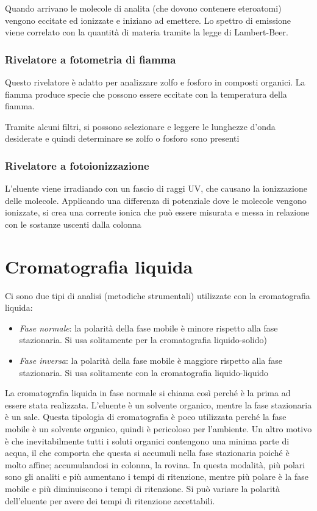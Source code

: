 
Quando arrivano le molecole di analita (che dovono contenere eteroatomi) vengono eccitate ed ionizzate e iniziano ad emettere. Lo spettro di emissione viene correlato con la quantità di materia tramite la legge di Lambert-Beer.

\subsubsection{Rivelatore a fotometria di fiamma}
Questo rivelatore è adatto per analizzare zolfo e fosforo in composti organici. La fiamma produce specie che possono essere eccitate con la temperatura della fiamma. 


Tramite alcuni filtri, si possono selezionare e leggere le lunghezze d'onda desiderate e quindi determinare se zolfo o fosforo sono presenti

\subsubsection{Rivelatore a fotoionizzazione}
L'eluente viene irradiando con un fascio di raggi UV, che causano la ionizzazione delle molecole. Applicando una differenza di potenziale dove le molecole vengono ionizzate, si crea una corrente ionica che può essere misurata e messa in relazione con le sostanze uscenti dalla colonna


\section{Cromatografia liquida}
Ci sono due tipi di analisi (metodiche strumentali) utilizzate con la cromatografia liquida:
\begin{itemize}
\item \textit{Fase normale}: la polarità della fase mobile è minore rispetto alla fase stazionaria. Si usa solitamente per la cromatografia liquido-solido)
\item \textit{Fase inversa}: la polarità della fase mobile è maggiore rispetto alla fase stazionaria. Si usa solitamente con la cromatografia liquido-liquido 
\end{itemize}

La cromatografia liquida in fase normale si chiama così perché è la prima ad essere stata realizzata. L'eluente è un solvente organico, mentre la fase stazionaria è un sale. Questa tipologia di cromatografia è poco utilizzata perché la fase mobile è un solvente organico, quindi è pericoloso per l'ambiente. Un altro motivo è che inevitabilmente tutti i soluti organici contengono una minima parte di acqua, il che comporta che questa si accumuli nella fase stazionaria poiché è molto affine; accumulandosi in colonna, la rovina. In questa modalità, più polari sono gli analiti e più aumentano i tempi di ritenzione, mentre più polare è la fase mobile e più diminuiscono i tempi di ritenzione. Si può variare la polarità dell'eluente per avere dei tempi di ritenzione accettabili.

